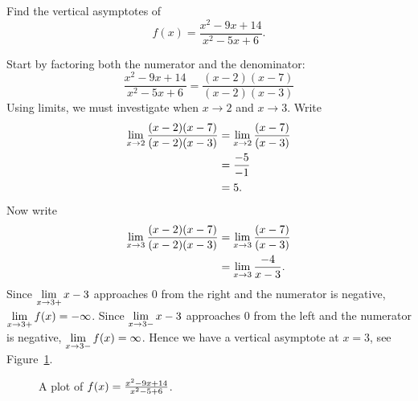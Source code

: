 \begin{example}
    Find the vertical asymptotes of 
    \[
    f(x) = \frac{x^2-9x+14}{x^2-5x+6}.
    \]
    \begin{solution}
        Start by factoring both the numerator and the denominator:
        \[
        \frac{x^2-9x+14}{x^2-5x+6} = \frac{(x-2)(x-7)}{(x-2)(x-3)}
        \]
        Using limits, we must investigate when $x\to 2$ and $x\to 3$. Write
        \begin{align*}
        \displaystyle\lim\limits_{x\to 2} \frac{(x-2)(x-7)}{(x-2)(x-3)} &= \displaystyle\lim\limits_{x\to 2} \frac{(x-7)}{(x-3)}\\
        &= \frac{-5}{-1}\\
        &=5.
        \end{align*}
        Now write
        \begin{align*}
        \displaystyle\lim\limits_{x\to 3} \frac{(x-2)(x-7)}{(x-2)(x-3)} &= \displaystyle\lim\limits_{x\to 3} \frac{(x-7)}{(x-3)}\\
        &= \displaystyle\lim\limits_{x\to 3}\frac{-4}{x-3}.
        \end{align*}
        Since $\displaystyle\lim\limits_{x\to 3+} x-3$ approaches $0$ from the right and the
        numerator is negative, $\displaystyle\lim\limits_{x\to 3+} f(x) = -\infty$. Since
        $\displaystyle\lim\limits_{x\to 3-} x-3$ approaches $0$ from the left and the numerator is
        negative, $\displaystyle\lim\limits_{x\to 3-} f(x) = \infty$. Hence we have a vertical
        asymptote at $x=3$, see Figure~\ref{plot:(x^2-9x+14)/(x^2-5x+6)}.
    \end{solution}
    \begin{figure}[H]
        \centering
        \caption{A plot of $f(x)=\protect\frac{x^2-9x+14}{x^2-5+6}$. \cite{mooc}}
        \label{plot:(x^2-9x+14)/(x^2-5x+6)}
    \end{figure}
\end{example}

